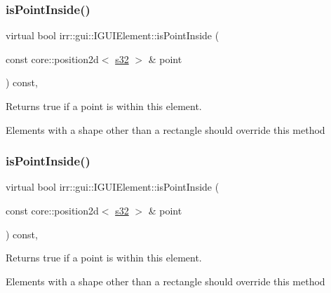 \subsubsection{\texorpdfstring{is\+Point\+Inside()}{isPointInside()}\hspace{0.1cm}{\footnotesize\ttfamily [1/2]}}
{\footnotesize\ttfamily virtual bool irr\+::gui\+::\+I\+G\+U\+I\+Element\+::is\+Point\+Inside (\begin{DoxyParamCaption}\item[{const core\+::position2d$<$ \hyperlink{namespaceirr_ac66849b7a6ed16e30ebede579f9b47c6}{s32} $>$ \&}]{point }\end{DoxyParamCaption}) const\hspace{0.3cm}{\ttfamily [inline]}, {\ttfamily [virtual]}}



Returns true if a point is within this element. 

Elements with a shape other than a rectangle should override this method \mbox{\label{classirr_1_1gui_1_1IGUIElement_a1aaf30a10b77f192dda8c548c109de89}} 
\subsubsection{\texorpdfstring{is\+Point\+Inside()}{isPointInside()}\hspace{0.1cm}{\footnotesize\ttfamily [2/2]}}
{\footnotesize\ttfamily virtual bool irr\+::gui\+::\+I\+G\+U\+I\+Element\+::is\+Point\+Inside (\begin{DoxyParamCaption}\item[{const core\+::position2d$<$ \hyperlink{namespaceirr_ac66849b7a6ed16e30ebede579f9b47c6}{s32} $>$ \&}]{point }\end{DoxyParamCaption}) const\hspace{0.3cm}{\ttfamily [inline]}, {\ttfamily [virtual]}}



Returns true if a point is within this element. 

Elements with a shape other than a rectangle should override this method \mbox{\label{classirr_1_1gui_1_1IGUIElement_a9b1880048e7542dbe289295de69e77cd}} 
